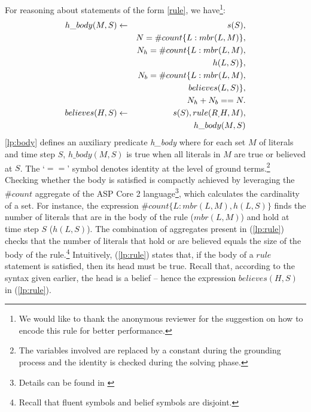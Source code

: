 \documentclass{article}
\begin{document}
 For reasoning about statements of the form \eqref{rule}, we have\footnote{
 We would like to thank the anonymous reviewer for the suggestion on how to encode this rule for better performance.  
 }:  %
%
\begin{eqnarray}
h\_body(M,S) & \leftarrow  &  s(S), \nonumber \\ 
        & & N  = \# count \{L : mbr(L, M)\},    \nonumber\\
        & & N_h= \# count \{L : mbr(L, M),  \nonumber\\
        & & \hspace*{.8in}h(L, S) \},  \nonumber\\ 
        & & N_b = \# count \{L : mbr(L, M), \nonumber\\
        & &\hspace*{.44in}believes(L, S) \}, \nonumber \\
        & & N_h+N_b==N. \label{lp:body} \\
believes(H, S) & \leftarrow & s(S),  rule(R_, H, M), \nonumber \\
        && h\_body(M,S)   \label{lp:rule}
%
\end{eqnarray} 
%
\eqref{lp:body} defines an auxiliary predicate \textit{h\_body} where for each set $M$ of literals and time step $S$, 
$h\_body(M,S)$ is true when all literals in $M$ are true or believed at $S$. 
The `$==$' symbol denotes identity at the level of ground terms.\footnote{The variables involved are replaced by a constant during the grounding process and the identity is checked during the solving phase.} Checking whether the body is satisfied is compactly achieved by leveraging the $\#count$ aggregate of the ASP Core 2 language\footnote{Details can be found in \cite{ASPCore2Standard}}, which calculates the cardinality of a set. For instance, the expression $\# count \{L : mbr(L, M), h(L, S) \}$ finds the number of literals that are in the body of the rule ($mbr(L,M)$) and hold at time step $S$ ($h(L,S)$). The combination of aggregates present in (\ref{lp:rule}) checks that the number of literals that hold or are believed equals the size of the body of the rule.\footnote{Recall that fluent symbols and belief symbols are disjoint. }
Intuitively, (\ref{lp:rule}) states that, if the body of a $rule$ statement is satisfied, then its head must be true. Recall that, according to the syntax given earlier, the head is a belief -- hence the expression $believes(H,S)$ in (\ref{lp:rule}). 
\end{document}
